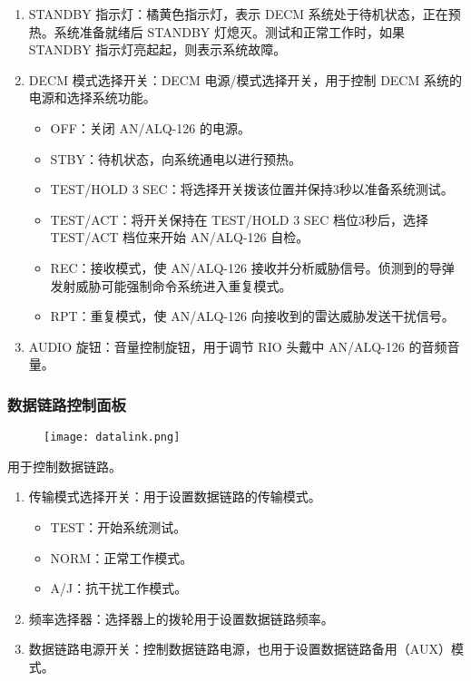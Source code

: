 \begin{enumerate}
  \item STANDBY 指示灯：橘黄色指示灯，表示 DECM 系统处于待机状态，正在预热。系统准备就绪后 STANDBY 灯熄灭。测试和正常工作时，如果 STANDBY 指示灯亮起起，则表示系统故障。
  \item DECM 模式选择开关：DECM 电源/模式选择开关，用于控制 DECM 系统的电源和选择系统功能。
  \begin{itemize}
    \item OFF：关闭 AN/ALQ-126 的电源。
    \item STBY：待机状态，向系统通电以进行预热。
    \item TEST/HOLD 3 SEC：将选择开关拨该位置并保持3秒以准备系统测试。
    \item TEST/ACT：将开关保持在 TEST/HOLD 3 SEC 档位3秒后，选择 TEST/ACT 档位来开始 AN/ALQ-126 自检。
    \item REC：接收模式，使 AN/ALQ-126 接收并分析威胁信号。侦测到的导弹发射威胁可能强制命令系统进入重复模式。
    \item RPT：重复模式，使 AN/ALQ-126 向接收到的雷达威胁发送干扰信号。
  \end{itemize}
  \item AUDIO 旋钮：音量控制旋钮，用于调节 RIO 头戴中 AN/ALQ-126 的音频音量。
\end{enumerate}

\subsubsection{数据链路控制面板}
\begin{figure}[htb]
  \center
  \texttt{[image: datalink.png]}
\end{figure}
用于控制数据链路。

\begin{enumerate}
  \item 传输模式选择开关：用于设置数据链路的传输模式。
  \begin{itemize}
    \item TEST：开始系统测试。
    \item NORM：正常工作模式。
    \item A/J：抗干扰工作模式。
  \end{itemize}
  \item 频率选择器：选择器上的拨轮用于设置数据链路频率。
  \item 数据链路电源开关：控制数据链路电源，也用于设置数据链路备用（AUX）模式。
\end{enumerate}


